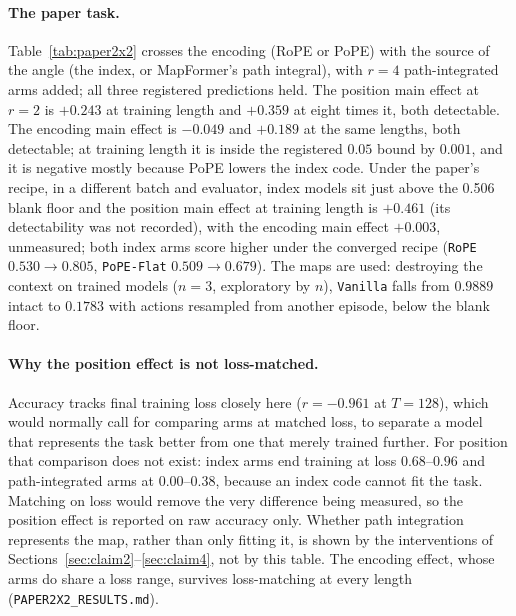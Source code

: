 \documentclass[10pt]{article}
\newcommand{\arm}[1]{\texttt{#1}}
\begin{document}
\paragraph{The paper task.} Table~\ref{tab:paper2x2} crosses the encoding (RoPE or PoPE) with the source of the
angle (the index, or MapFormer's path integral), with $r=4$ path-integrated arms added; all three registered
predictions held. The position main effect at $r=2$ is $+0.243$ at training length and
$+0.359$ at eight times it, both detectable. The encoding main effect is $-0.049$ and $+0.189$ at the same
lengths, both detectable; at training length it is inside the registered $0.05$ bound by $0.001$, and it is
negative mostly because PoPE lowers the index code. Under the paper's recipe, in a different batch and evaluator,
index models sit just above the 0.506 blank floor and the position main effect at training length is $+0.461$ (its
detectability was not recorded), with the encoding main effect $+0.003$, unmeasured; both index arms score higher under the
converged recipe (\arm{RoPE} $0.530\to0.805$, \arm{PoPE-Flat} $0.509\to0.679$). The maps are used: destroying
the context on trained models ($n=3$, exploratory by $n$), \arm{Vanilla} falls from $0.9889$ intact to $0.1783$
with actions resampled from another episode, below the blank floor.

\paragraph{Why the position effect is not loss-matched.} Accuracy tracks final training loss closely here ($r=-0.961$ at $T=128$), which would normally call for comparing arms at matched loss, to separate a model that represents the task better from one that merely trained further. For position that comparison does not exist: index arms end training at loss $0.68$--$0.96$ and path-integrated arms at $0.00$--$0.38$, because an index code cannot fit the task. Matching on loss would remove the very difference being measured, so the position effect is reported on raw accuracy only. Whether path integration represents the map, rather than only fitting it, is shown by the interventions of Sections~\ref{sec:claim2}--\ref{sec:claim4}, not by this table. The encoding effect, whose arms do share a loss range, survives loss-matching at every length (\texttt{PAPER2X2\_RESULTS.md}).
\end{document}
